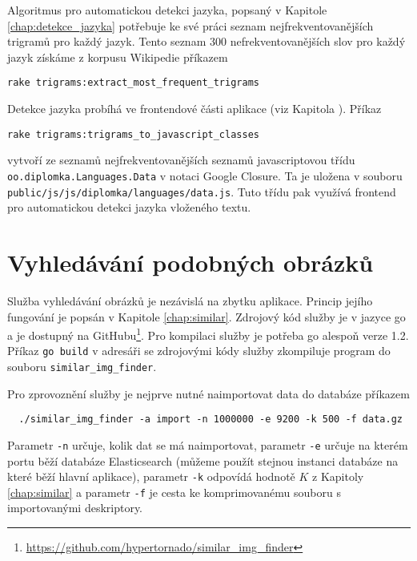 Algoritmus pro automatickou detekci jazyka, popsaný v Kapitole \ref{chap:detekce_jazyka} potřebuje ke své práci seznam nejfrekventovanějších trigramů pro každý jazyk. Tento seznam $300$ nefrekventovanějších slov pro každý jazyk získáme z korpusu Wikipedie příkazem

\begin{lstlisting}
rake trigrams:extract_most_frequent_trigrams
\end{lstlisting}

Detekce jazyka probíhá ve frontendové části aplikace (viz Kapitola \cite{chap:frontend}). Příkaz

\begin{lstlisting}
rake trigrams:trigrams_to_javascript_classes
\end{lstlisting}

vytvoří ze seznamů nejfrekventovanějších seznamů javascriptovou třídu \lstinline{oo.diplomka.Languages.Data} v notaci Google Closure. Ta je uložena v souboru \lstinline{public/js/js/diplomka/languages/data.js}. Tuto třídu pak využívá frontend pro automatickou detekci jazyka vloženého textu.

\section{Vyhledávání podobných obrázků}
\label{subsec:zprovozneni_podobne}

Služba vyhledávání obrázků je nezávislá na zbytku aplikace. Princip jejího fungování je popsán v Kapitole \ref{chap:similar}. Zdrojový kód služby je v jazyce go a je dostupný na GitHubu\footnote{\url{https://github.com/hypertornado/similar_img_finder}}. Pro kompilaci služby je potřeba go alespoň verze 1.2. Příkaz \lstinline{go build} v adresáři se zdrojovými kódy služby zkompiluje program do souboru \lstinline{similar_img_finder}.

Pro zprovoznění služby je nejprve nutné naimportovat data do databáze příkazem

\begin{lstlisting}
  ./similar_img_finder -a import -n 1000000 -e 9200 -k 500 -f data.gz
\end{lstlisting}

Parametr \lstinline{-n} určuje, kolik dat se má naimportovat, parametr \lstinline{-e} určuje na kterém portu běží databáze Elasticsearch (můžeme použít stejnou instanci databáze na které běží hlavní aplikace), parametr \lstinline{-k} odpovídá hodnotě $K$ z Kapitoly \ref{chap:similar} a parametr \lstinline{-f} je cesta ke komprimovanému souboru s importovanými deskriptory.


